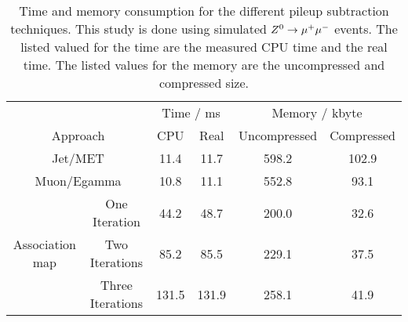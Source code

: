 
\begin{table}[h]
\begin{center}
\caption{Time and memory consumption for the different pileup subtraction techniques. This study is done using simulated ${Z^{0}}\rightarrow\mu^+\mu^-$ events. The listed valued for the time are the measured CPU time and the real time. The listed values for the memory are the uncompressed and compressed size.}
\label{tab:OSPTimMemZMM}

\begin{tabular}{c c c c c c }
 & & \multicolumn{2}{c}{Time / ms} & \multicolumn{2}{c}{Memory / kbyte}  \\
\multicolumn{2}{c}{Approach} & CPU & Real & Uncompressed & Compressed \\
\midrule[2pt]
\multicolumn{2}{c}{Jet/MET}  & 11.4 & 11.7 &  598.2 & 102.9 \\
\midrule
\multicolumn{2}{c}{Muon/Egamma}  & 10.8 & 11.1 & 552.8 & 93.1 \\
\midrule
\multirow{3}{*}{Association map} 
                        & One Iteration & 44.2 & 48.7 & 200.0 & 32.6 \\
\cmidrule{2-6}
                        & Two Iterations & 85.2 & 85.5 & 229.1 & 37.5 \\
\cmidrule{2-6}
                        & Three Iterations  & 131.5 & 131.9 & 258.1 & 41.9 \\

\end{tabular}

\end{center}
\end{table}